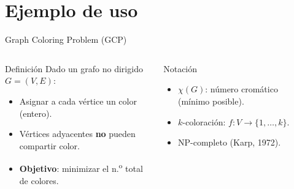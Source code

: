 \documentclass[aspectratio=169, 11pt, xcolor={dvipsnames,table}]{beamer}
\begin{document}



\section{Ejemplo de uso}

\begin{frame}{Graph Coloring Problem (GCP)}
\begin{columns}[T]
\begin{block}{Definición}
Dado un grafo no dirigido $G = (V, E)$:
\begin{itemize}
  \item Asignar a cada vértice un color (entero).
  \item Vértices adyacentes \textbf{no} pueden compartir color.
  \item \textbf{Objetivo}: minimizar el n.\textsuperscript{o} total de colores.
\end{itemize}
\end{block}

\begin{exampleblock}{Notación}
\begin{itemize}
  \item $\chi(G)$: número cromático (mínimo posible).
  \item $k$-coloración: $f: V \to \{1, \dots, k\}$.
  \item NP-completo (Karp, 1972).
\end{itemize}
\end{exampleblock}

\begin{center}
\end{center}
\end{columns}
\end{frame}
\end{document}
